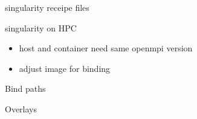 \documentclass{beamer}
\begin{document}
  \begin{frame}{singularity receipe files}
  \end{frame}

  \begin{frame}{singularity on HPC}
    \begin{itemize}
      \item host and container need same openmpi version
      \item adjust image for binding
    \end{itemize}
  \end{frame}

  \begin{frame}{Bind paths}

  \end{frame}

  \begin{frame}{Overlays}
  \end{frame}
\end{document}
